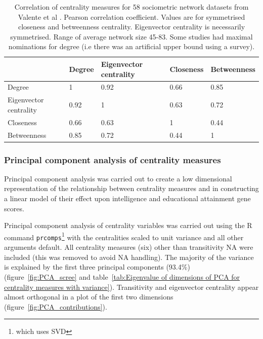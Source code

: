 \begin{table}[]
    \centering   \setlength{\extrarowheight}{2pt}
    \begin{tabular}{lllll}
    \toprule
          & Degree & Eigenvector centrality & Closeness & Betweenness \\
         \midrule
    Degree  & 1  & 0.92  & 0.66 & 0.85\\
    Eigenvector centrality & 0.92 & 1 & 0.63 & 0.72  \\
    Closeness & 0.66 & 0.63 & 1 & 0.44  \\
    Betweenness& 0.85 & 0.72 & 0.44 & 1 \\
    \bottomrule
    \end{tabular}
    \caption[Correlation of centrality measures for sociometric networks]{Correlation of centrality measures for 58 sociometric network datasets from Valente et al \cite{valente2008correlated}. Pearson correlation coefficient. Values are for symmetrised closeness and betweenness centrality. Eigenvector centrality is necessarily symmetrised. Range of average network size 45-83. Some studies had maximal nominations for degree (i.e there was an artificial upper bound using a survey).}
    \label{tab:Correlation of centrality valente et al}
\end{table}

\subsubsection{Principal component analysis of centrality measures}

Principal component analysis was carried out to create a low dimensional representation of the relationship between centrality measures and in constructing a linear model of their effect upon intelligence and educational attainment gene scores. 

Principal component analysis of centrality variables was carried out using the R command \texttt{prcomps}\footnote{which uses SVD} with the centralities scaled to unit variance and all other arguments default. All centrality measures (six) other than transitivity NA were included (this was removed to avoid NA handling). The majority of the variance is explained by the first three principal components (93.4\%) (figure~\ref{fig:PCA_scree} and table~\ref{tab:Eigenvalue of dimensions of PCA for centrality measures with variance}). Transitivity and eigenvector centrality appear almost orthogonal in a plot of the first two dimensions (figure~\ref{fig:PCA_contributions}).





